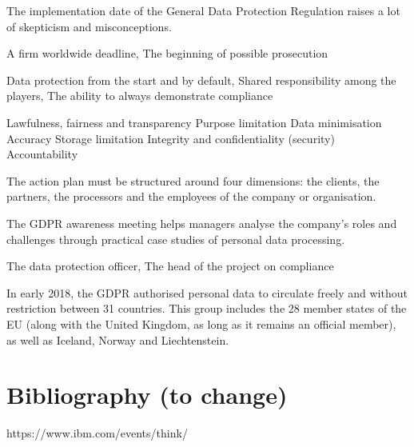 \begin{itemize}
 \textbf{ }
The implementation date of the General Data Protection Regulation raises a lot of skepticism and misconceptions.

A firm worldwide deadline, The beginning of possible prosecution

Data protection from the start and by default, Shared responsibility among the players, The ability to always demonstrate compliance

Lawfulness, fairness and transparency
Purpose limitation
Data minimisation
Accuracy
Storage limitation
Integrity and confidentiality (security)
Accountability


The action plan must be structured around four dimensions: the clients, the partners, the processors and the employees of the company or organisation.

The GDPR awareness meeting helps managers analyse the company’s roles and challenges through practical case studies of personal data processing.

The data protection officer, The head of the project on compliance

In early 2018, the GDPR authorised personal data to circulate freely and without restriction between 31 countries. This group includes the 28 member states of the EU (along with the United Kingdom, as long as it remains an official member), as well as Iceland, Norway and Liechtenstein.

\section{Bibliography (to change)}
https://www.ibm.com/events/think/
\blindtext
\end{itemize}



